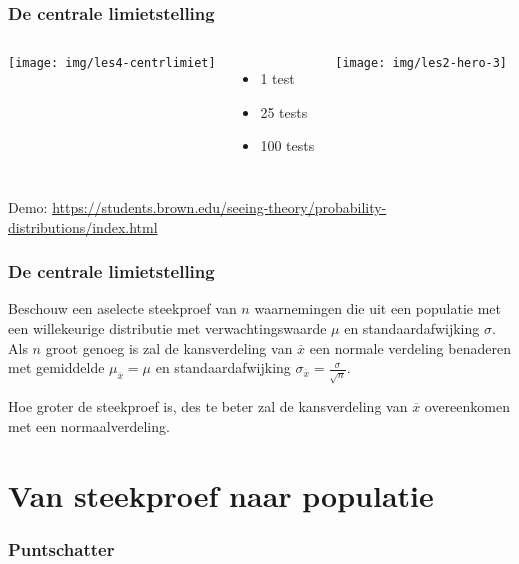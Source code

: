 \documentclass[aspectratio=169]{beamer}
\begin{document}
\begin{frame}
  \frametitle{De centrale limietstelling}


  \vfill

  \begin{columns}[c]
    \texttt{[image: img/les4-centrlimiet]}
    \begin{itemize}
      \item 1 test
      \item 25 tests
      \item 100 tests
    \end{itemize}
    \texttt{[image: img/les2-hero-3]}
  \end{columns}

\vfill
Demo: \url{https://students.brown.edu/seeing-theory/probability-distributions/index.html}
\end{frame}

\begin{frame}
  \frametitle{De centrale limietstelling}
  Beschouw een aselecte steekproef van $n$ waarnemingen die uit een populatie met een willekeurige distributie met verwachtingswaarde $\mu$ en standaardafwijking $\sigma$. Als $n$ groot genoeg is zal de kansverdeling van $\overline{x}$ een normale verdeling benaderen met gemiddelde $\mu_{\overline{x}} = \mu$ en standaardafwijking $\sigma_{\overline{x}} = \frac{\sigma}{\sqrt{n}}$.

\vspace{0.4cm}
  Hoe groter de steekproef is, des te beter zal de kansverdeling van $\overline{x}$ overeenkomen met een normaalverdeling.
\end{frame}

\section{Van steekproef naar populatie}

\begin{frame}
  \frametitle{Puntschatter}
\end{frame}
\end{document}
